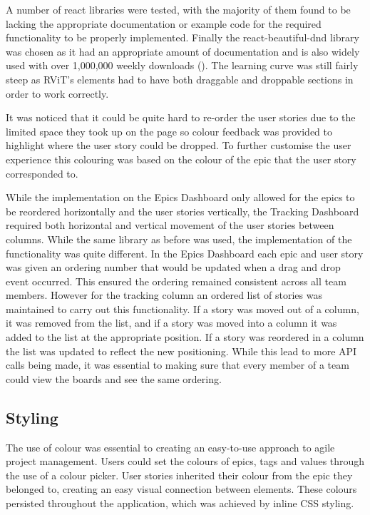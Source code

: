 \documentclass[l4proj.tex]{subfiles}
\begin{document}
A number of react libraries were tested, with the majority of them found to be lacking the appropriate documentation or example code for the required functionality to be properly implemented. Finally the react-beautiful-dnd library was chosen as it had an appropriate amount of documentation and is also widely used with over 1,000,000 weekly downloads (\cite{ReactDnD}). The learning curve was still fairly steep as RViT's elements had to have both draggable and droppable sections in order to work correctly. 

It was noticed that it could be quite hard to re-order the user stories due to the limited space they took up on the page so colour feedback was provided to highlight where the user story could be dropped. To further customise the user experience this colouring was based on the colour of the epic that the user story corresponded to. 

While the implementation on the Epics Dashboard only allowed for the epics to be reordered horizontally and the user stories vertically, the Tracking Dashboard required both horizontal and vertical movement of the user stories between columns. While the same library as before was used, the implementation of the functionality was quite different. In the Epics Dashboard each epic and user story was given an ordering number that would be updated when a drag and drop event occurred. This ensured the ordering remained consistent across all team members. However for the tracking column an ordered list of stories was maintained to carry out this functionality. If a story was moved out of a column, it was removed from the list, and if a story was moved into a column it was added to the list at the appropriate position. If a story was reordered in a column the list was updated to reflect the new positioning. While this lead to more API calls being made, it was essential to making sure that every member of a team could view the boards and see the same ordering. 

\subsection{Styling}
The use of colour was essential to creating an easy-to-use approach to agile project management. Users could set the colours of epics, tags and values through the use of a colour picker. User stories inherited their colour from the epic they belonged to, creating an easy visual connection between elements. These colours persisted throughout the application, which was achieved by inline CSS styling. 
\end{document}
